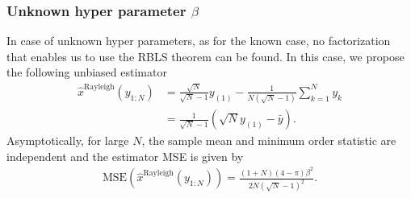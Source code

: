 \documentclass{article}
\newcommand{\MSE}{\mathrm{MSE}}
\begin{document}
\subsubsection{Unknown hyper parameter $\beta$}
 In case of unknown hyper parameters, as for the known case, no factorization that enables us to use the RBLS theorem can be found. In this case, we propose the following unbiased estimator
%
%
\begin{align}
\hat{x}^{\mathrm{Rayleigh}}(y_{1:N}) &= \frac{\sqrt{N}}{\sqrt{N}-1}y_{(1)} - \frac{1}{N(\sqrt{N}-1)}\sum_{k=1}^{N}y_k\nonumber\\&= \frac{1}{\sqrt N-1}(\sqrt{N}y_{(1)} - \bar{y}).
\end{align}
%
% 
Asymptotically, for large $N$, the sample mean and minimum order statistic are independent and the estimator MSE is given by
%
%
\begin{align}
\MSE\left(\hat{x}^{\mathrm{Rayleigh}}(y_{1:N})\right)=\frac{(1+N)(4-\pi)\beta^2}{2N(\sqrt{N}-1)^2}.
\label{eq:minimum_orde_unknown_rayleigh}
\end{align}
%
%
\end{document}
